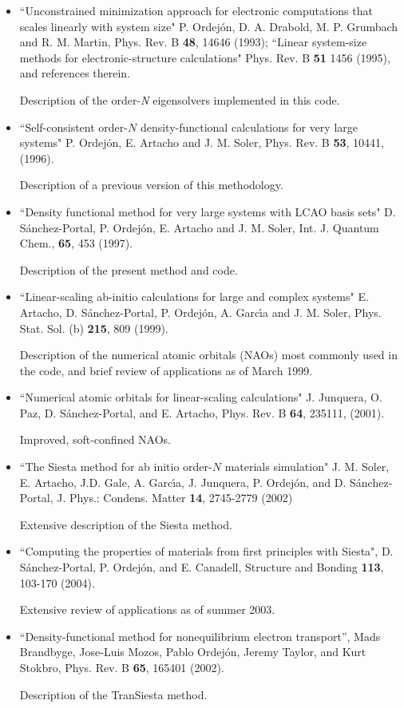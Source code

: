 \documentclass[11pt]{article}
\begin{document}
\begin{itemize}

\item
``Unconstrained minimization approach for electronic computations
that scales linearly with system size"
P. Ordej\'on, D. A. Drabold, M. P. Grumbach and R. M. Martin, 
Phys. Rev. B {\bf 48}, 14646 (1993); 
``Linear system-size methods for electronic-structure calculations"
Phys. Rev. B {\bf 51} 1456 (1995), and references therein.

Description of the order-{\it N} eigensolvers
implemented in this code.

\item
``Self-consistent order-$N$ density-functional 
calculations for very large systems"
P. Ordej\'on, E. Artacho and J. M. Soler,
Phys. Rev. B {\bf 53}, 10441, (1996).

Description of a previous version of this methodology.

\item
``Density functional method for very large systems with LCAO basis sets"
D. S\'anchez-Portal, P. Ordej\'on, E. Artacho and J. M. Soler,
Int. J. Quantum Chem., {\bf 65}, 453 (1997).

Description of the present method and code.

\item
``Linear-scaling ab-initio calculations for large and complex systems"
E. Artacho, D. S\'anchez-Portal, P. Ordej\'on, A. Garc\'{\i}a and
J. M. Soler, Phys. Stat. Sol. (b) {\bf 215}, 809 (1999).

Description of the numerical atomic orbitals (NAOs) most commonly 
used in the code, and brief review of applications as of March 1999.

\item
``Numerical atomic orbitals for linear-scaling calculations"
J. Junquera, O. Paz, D. S\'anchez-Portal, and E. Artacho, Phys. Rev. B
 {\bf 64}, 235111, (2001).

Improved, soft-confined NAOs.

\item
``The {\sc Siesta} method for ab initio order-$N$ materials simulation"
J. M. Soler, E. Artacho, J.D. Gale, A. Garc\'{\i}a, J. Junquera, P. Ordej\'on,
and D. S\'anchez-Portal, J. Phys.: Condens. Matter {\bf 14}, 2745-2779 (2002) 

Extensive description of the {\sc Siesta} method.

\item 
``Computing the properties of materials from first principles 
with  {\sc Siesta}", D. S\'anchez-Portal, P. Ordej\'on, 
and E. Canadell, Structure and Bonding {\bf 113},
103-170 (2004).

Extensive review of applications as of summer 2003.

\item
 ``Density-functional method for nonequilibrium electron transport'', 
 Mads Brandbyge, Jose-Luis Mozos, Pablo Ordej\'on, Jeremy Taylor, 
 and Kurt Stokbro, Phys. Rev. B {\bf 65}, 165401 (2002).

 Description of the {\sc TranSiesta} method.
 
\end{itemize}
\end{document}
